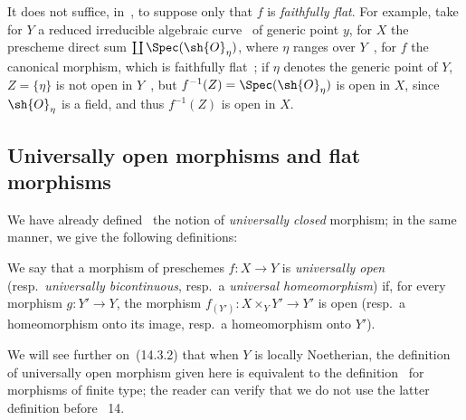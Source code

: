 \begin{remark}[2.3.15]
\label{IV.2.3.15}
It does not suffice, in~, to suppose only that $f$ is \emph{faithfully flat}.
For example, take for $Y$ a reduced irreducible algebraic curve~ of generic point
$y$, for $X$ the prescheme direct sum $\coprod\Spec(\sh{O}_\eta)$, where $\eta$ ranges over $Y$~, for $f$ the canonical morphism, which is faithfully flat~;
if $\eta$ denotes the generic point of $Y$, $Z=\{\eta\}$ is not open in $Y$~, but $f^{-1}(Z)=\Spec(\sh{O}_\eta)$ is open in $X$, since $\sh{O}_\eta$ is a field, and thus $f^{-1}(Z)$ is open in $X$.
\end{remark}

\subsection{Universally open morphisms and flat morphisms}
\label{subsection:IV.2.4}

\begin{env}[2.4.1]
\label{IV.2.4.1}
We have already defined~ the notion of \emph{universally closed} morphism; in the same manner, we give the following definitions:
\end{env}

\begin{definition}[2.4.2]
\label{IV.2.4.2}
We say that a morphism of preschemes $f:X\to Y$ is \emph{universally open} \textnormal{(}resp.\ \emph{universally bicontinuous}, resp.\ a \emph{universal homeomorphism}\textnormal{)} if, for every morphism $g:Y'\to Y$, the morphism $f_{(Y')}:X\times_Y Y'\to Y'$ is open \textnormal{(}resp.\ a homeomorphism onto its image, resp.\ a homeomorphism onto $Y'$\textnormal{)}.
\end{definition}

We will see further on~(14.3.2) that when $Y$ is locally Noetherian, the definition of universally open morphism given here is equivalent to the definition~ for morphisms of finite type; the reader can verify that we do not use the latter definition before \textsection~14.

